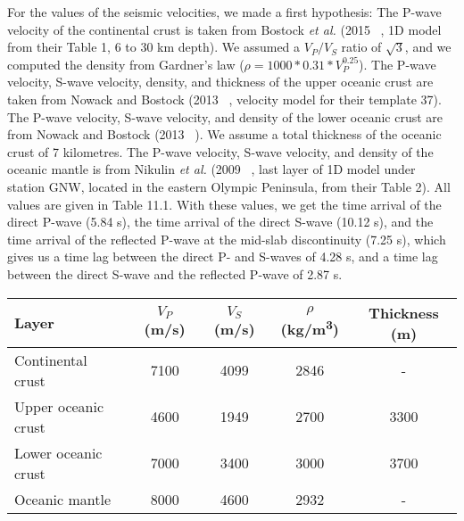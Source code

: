 \documentclass[workdone.tex]{subfiles}
\begin{document}
For the values of the seismic velocities, we made a first hypothesis: The P-wave velocity of the continental crust is taken from Bostock \textit{et al.} (2015 ~\cite{BOS_2015}, 1D model from their Table 1, 6 to 30 km depth). We assumed a $V_P / V_S$ ratio of $\sqrt{3}$, and we computed the density from Gardner's law ($\rho = 1000 * 0.31 * V_P^{0.25}$). The P-wave velocity, S-wave velocity, density, and thickness of the upper oceanic crust are taken from Nowack and Bostock (2013 ~\cite{NOW_2013}, velocity model for their template 37). The P-wave velocity, S-wave velocity, and density of the lower oceanic crust are from Nowack and Bostock (2013 ~\cite{NOW_2013}). We assume a total thickness of the oceanic crust of 7 kilometres. The P-wave velocity, S-wave velocity, and density of the oceanic mantle is from Nikulin \textit{et al.} (2009 ~\cite{NIK_2009}, last layer of 1D model under station GNW, located in the eastern Olympic Peninsula, from their Table 2). All values are given in Table 11.1. With these values, we get the time arrival of the direct P-wave (5.84 s), the time arrival of the direct S-wave (10.12 s), and the time arrival of the reflected P-wave at the mid-slab discontinuity (7.25 s), which gives us a time lag between the direct P- and S-waves of 4.28 s, and a time lag between the direct S-wave and the reflected P-wave of 2.87 s. \\

\begin{center}
\begin{tabular}{| l | c | c | c | c |}
  \hline
  Layer & $V_P$ (m/s) & $V_S$ (m/s) & $\rho$ (kg/m\textsuperscript{3}) & Thickness (m) \\
  \hline
  Continental crust & 7100 & 4099 & 2846 & - \\
  Upper oceanic crust & 4600 & 1949 & 2700 & 3300 \\
  Lower oceanic crust & 7000 & 3400 & 3000 & 3700 \\
  Oceanic mantle & 8000 & 4600 & 2932 & - \\
  \hline
\end{tabular}
\captionsetup{type=table}
\end{center}
\end{document}
